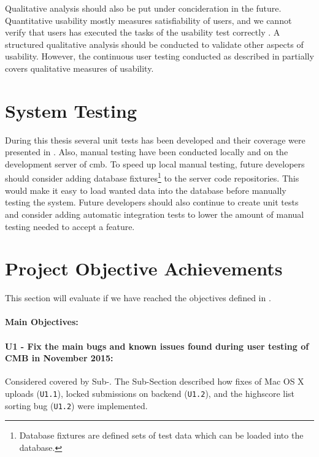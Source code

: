 Qualitative analysis should also be put under concideration in the future. Quantitative usability mostly measures satisfiability of users, and we cannot verify that users has executed the tasks of the usability test correctly \cite{holzinger2005}. A structured qualitative analysis should be conducted to validate other aspects of usability. However, the continuous user testing conducted as described in  partially covers qualitative measures of usability.

\section{System Testing}
\label{sec:eval-sys-testing}
During this thesis several unit tests has been developed and their coverage were presented in . Also, manual testing have been conducted locally and on the development server of \gls{cmb}. To speed up local manual testing, future developers should consider adding database fixtures\footnote{Database fixtures are defined sets of test data which can be loaded into the database.} to the server code repositories. This would make it easy to load wanted data into the database before manually testing the system. Future developers should also continue to create unit tests and consider adding automatic integration tests to lower the amount of manual testing needed to accept a feature.

\section{Project Objective Achievements}
\label{sec:eval-pr-achiev}
This section will evaluate if we have reached the objectives defined in .

\paragraph*{Main Objectives:} \hfill

\paragraph*{U1 - Fix the main bugs and known issues found during user testing of CMB in November 2015:} Considered covered by Sub-. The Sub-Section described how fixes of Mac OS X uploads (\texttt{U1.1}), locked submissions on backend (\texttt{U1.2}), and the highscore list sorting bug (\texttt{U1.2}) were implemented.

